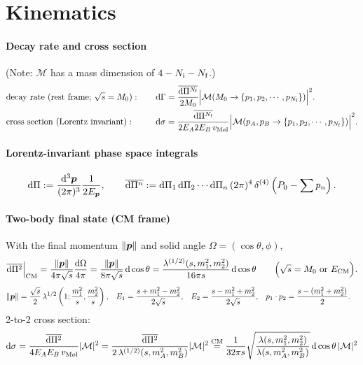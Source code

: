\documentclass[CheatSheet]{subfiles}
\begin{document}
\newcommand{\ddP}[2][3]{\frac{\dd^{#1}\vc#2}{(2\pi)^{#1}}}

\summarystyle
\section{Kinematics}

\paragraph{Decay rate and cross section}  (Note: $\mathcal M$ has a mass dimension of $4-N_{\text{i}}-N_{\text{f}}$.)
\begin{alignat}{2}
&
\text{decay rate (rest frame; $\sqrt{s}=M_0$)}:
&\quad&
\dd\Gamma=
\frac{\overline{\dd\Pi^{N\w f}}}{2M_0}
\Bigl|\mathcal M(M_0\to\left\{p_1, p_2,\cdots, p_{N\w f}\right\})\Bigr|^2.
\\
&\text{cross section (Lorentz invariant)}:
&&
\dd\sigma =
\frac{\overline{\dd\Pi^{N\w f}}}{2E_A2E_B\,v_{\text{M\o l}}}
\Bigl|\mathcal M(p_A,p_B\to\left\{p_1, p_2,\cdots, p_{N\w f}\right\})\Bigr|^2.
\end{alignat}
\paragraph{Lorentz-invariant phase space integrals}
\begin{equation}
 \dd\Pi := \ddP{p}\frac{1}{2E_{\vc p}},\qquad
  \overline{\dd\Pi^{n}} := \dd\Pi_1\dd\Pi_2\cdots\dd\Pi_n\,(2\pi)^4\diracdelta[4]\left(P_0-\sum p_n\right).
\end{equation}
\paragraph{Two-body final state (CM frame)}
With the final momentum $\|{\boldsymbol{p}}\|$ and solid angle $\Omega=(\cos\theta,\phi)$,
\begin{equation}
\overline{\dd\Pi^{2}}\Big|\w{CM}
=\frac{\|\vc p\|}{4\pi\sqrt{s}}\frac{\dd\Omega}{4\pi}
=
\frac{\|\vc p\|}{8\pi \sqrt{s}}\dd\cos\theta
=
\frac{\Kallen[1/2](s,m_1^2,m_2^2)}{16\pi s}\dd\cos\theta
\qquad \Bigl(\text{$\sqrt s = M_0$ or $E\w{CM}$}\Bigr).
\end{equation}
\begin{align*}
\|{\boldsymbol{p}}\|&=\frac{\sqrt{s}}{2}\mathop{\lambda^{1/2}}\left(1;\frac{m_1^2}{s},\frac{m_2^2}{s}\right),&
 E_1&=\frac{s+m_1^2-m_2^2}{2\sqrt{s}},&
 E_2&=\frac{s-m_1^2+m_2^2}{2\sqrt{s}},&
 p_1\cdot p_2 &= \frac{s-(m_1^2+m_2^2)}{2}.
\end{align*}
2-to-2 cross section:
\begin{equation}
\dd\sigma
= \frac{\overline{\dd\Pi^{2}}}{4E_AE_B\,v_{\text{M\o l}}}|\mathcal M|^2
= \frac{\overline{\dd\Pi^{2}}}{2\Kallen[1/2](s,m_A^2,m_B^2)}|\mathcal M|^2
\stackrel{\text{CM}}{=}\frac{1}{32\pi s}
  \sqrt{\frac{\Kallen(s,m_1^2,m_2^2)}{\Kallen(s,m_A^2,m_B^2)}}
  \dd\cos\theta\,|\mathcal M|^2
\end{equation}
\end{document}
